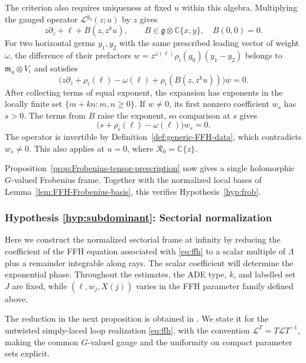 \documentclass[11pt,leqno]{amsart}
\numberwithin{equation}{section}
\theoremstyle{plain}
\theoremstyle{definition}
\theoremstyle{plain}
\theoremstyle{definition}
\theoremstyle{remark}
\newcommand{\g}{\mathfrak g}
\begin{document}
The criterion also requires uniqueness at fixed $u$ within this algebra.  Multiplying the gauged operator $\mathcal L^{g_0}(z;u)$ by $z$ gives
\[
 z\partial_z+\ell+B(z,z^ku),\qquad
 B\in\g\otimes\mathbb C\{x,y\},\quad B(0,0)=0.
\]
For two horizontal germs $y_1,y_2$ with the same prescribed leading vector of weight $\omega$, the difference of their prefactors $w=z^{\omega(\ell)}\rho_i(g_0)(y_1-y_2)$ belongs to $\mathfrak m_u\otimes V_i$ and satisfies
\[
 \bigl(z\partial_z+\rho_i(\ell)-\omega(\ell)
                  +\rho_i(B(z,z^ku))\bigr)w=0.
\]
After collecting terms of equal exponent, the expansion has exponents in the locally finite set $\{m+kn:m,n\ge0\}$.  If $w\ne0$, its first nonzero coefficient $w_s$ has $s>0$.  The terms from $B$ raise the exponent, so comparison at $s$ gives
\[
 \bigl(s+\rho_i(\ell)-\omega(\ell)\bigr)w_s=0.
\]
The operator is invertible by Definition~\ref{def:generic-FFH-data}, which contradicts $w_s\ne0$.  This also applies at $u=0$, where $\mathcal R_0=\mathbb C\{z\}$.

Proposition~\ref{prop:Frobenius-tensor-prescription} now gives a single holomorphic $G$-valued Frobenius frame.  Together with the normalized local bases of Lemma~\ref{lem:FFH-Frobenius-basis}, this verifies Hypothesis~\ref{hyp:frob}.

\subsubsection{Hypothesis \ref{hyp:subdominant}: Sectorial normalization}\label{sec:FFH-hyp-sectorial}

Here we construct the normalized sectorial frame at infinity by reducing the coefficient of the FFH equation associated with \eqref{eq:ffh} to a scalar multiple of $\Lambda$ plus a remainder integrable along rays.  The scalar coefficient will determine the exponential phase.  Throughout the estimates, the ADE type, $k$, and labelled set $J$ are fixed, while $(\ell,w_j,X(j))$ varies in the FFH parameter family defined above.

The reduction in the next proposition is obtained in \cite[proof of Proposition~3.20]{MR2024}.  We state it for the untwisted simply-laced loop realization \eqref{eq:ffh}, with the convention $\mathcal L^T=T\mathcal L T^{-1}$, making the common $G$-valued gauge and the uniformity on compact parameter sets explicit.
\end{document}
